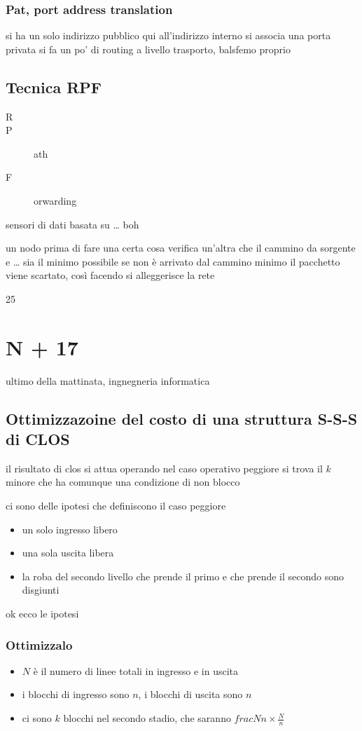 \documentclass[11pt]{article}
\begin{document}
\subsubsection{Pat, port address translation}
\label{sec:org6bac880}
si ha un solo indirizzo pubblico
qui all'indirizzo interno si associa una porta privata
si fa un po' di routing a livello trasporto, balsfemo proprio

\subsection{Tecnica RPF}
\label{sec:orgd6a0228}
\begin{description}
\item[{R}] 

\item[{P}] ath
\item[{F}] orwarding
\end{description}

sensori
di dati basata su \ldots{} boh   

un nodo prima di fare una certa cosa verifica un'altra
che il cammino da sorgente e \ldots{} sia il minimo possibile
se non è arrivato dal cammino minimo il pacchetto viene scartato, così facendo si alleggerisce la rete

25

\section{N + 17}
\label{sec:org12c8d87}
ultimo della mattinata, ingnegneria informatica
\subsection{Ottimizzazoine del costo di una struttura S-S-S di CLOS}
\label{sec:org9c1555c}
il risultato di clos si attua operando nel caso operativo peggiore
si trova il \(k\) minore che ha comunque una condizione di non blocco

ci sono delle ipotesi che definiscono il caso peggiore
\begin{itemize}
\item un solo ingresso libero
\item una sola uscita libera
\item la roba del secondo livello che prende il primo e che prende il secondo sono disgiunti
\end{itemize}

ok ecco le ipotesi
\subsubsection{Ottimizzalo}
\label{sec:orgbe800c5}
\begin{itemize}
\item \(N\) è il numero di linee totali in ingresso e in uscita
\item i blocchi di ingresso sono \(n\), i blocchi di uscita sono \(n\)
\item ci sono \(k\) blocchi nel secondo stadio, che saranno \(frac{N}{n} \times \frac{N}{n}\)
\end{itemize}
\end{document}
